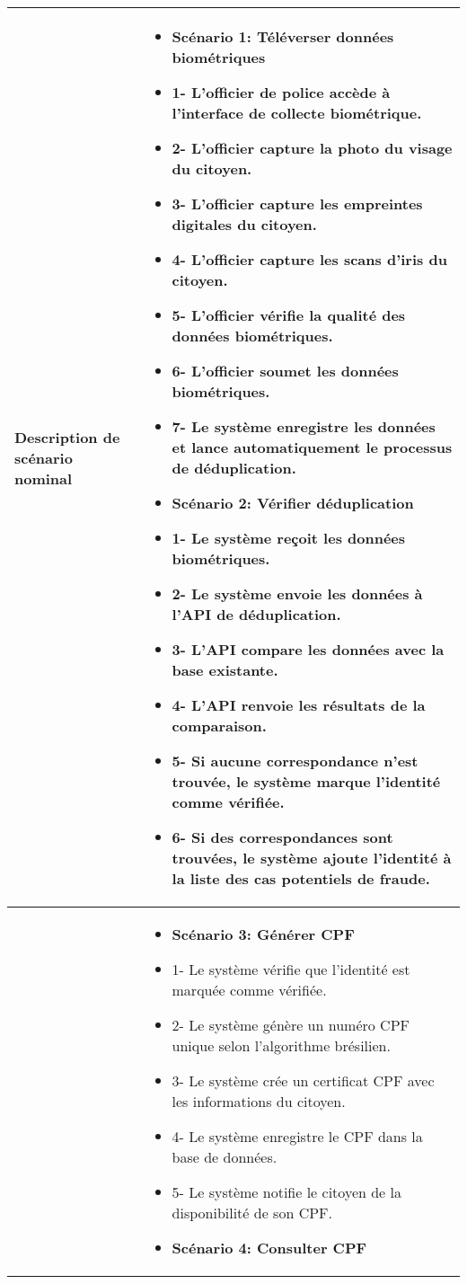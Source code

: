 \begin{longtable}{|>{\arraybackslash}p{4.2cm}|>{\arraybackslash}p{12.5cm}|}
\hline
\textbf{Description de scénario nominal }  &
\begin{itemize}[label=]
  \item\textbf{Scénario 1: Téléverser données biométriques}
 \item{1-} L'officier de police accède à l'interface de collecte biométrique.
 \item{2-} L'officier capture la photo du visage du citoyen.
 \item{3-} L'officier capture les empreintes digitales du citoyen.
 \item{4-} L'officier capture les scans d'iris du citoyen.
 \item{5-} L'officier vérifie la qualité des données biométriques.
 \item{6-} L'officier soumet les données biométriques.
 \item{7-} Le système enregistre les données et lance automatiquement le processus de déduplication.
 \item\textbf{Scénario 2: Vérifier déduplication}
 \item{1-} Le système reçoit les données biométriques.
 \item{2-} Le système envoie les données à l'API de déduplication.
 \item{3-} L'API compare les données avec la base existante.
 \item{4-} L'API renvoie les résultats de la comparaison.
 \item{5-} Si aucune correspondance n'est trouvée, le système marque l'identité comme vérifiée.
 \item{6-} Si des correspondances sont trouvées, le système ajoute l'identité à la liste des cas potentiels de fraude.
\end{itemize} \\
\hline
\textbf{}&
\begin{itemize}[label=]
  \item\textbf{Scénario 3: Générer CPF}
 \item{1-} Le système vérifie que l'identité est marquée comme vérifiée.
 \item{2-} Le système génère un numéro CPF unique selon l'algorithme brésilien.
 \item{3-} Le système crée un certificat CPF avec les informations du citoyen.
 \item{4-} Le système enregistre le CPF dans la base de données.
 \item{5-} Le système notifie le citoyen de la disponibilité de son CPF.
 \item\textbf{Scénario 4: Consulter CPF}

\end{itemize}
\end{longtable}
